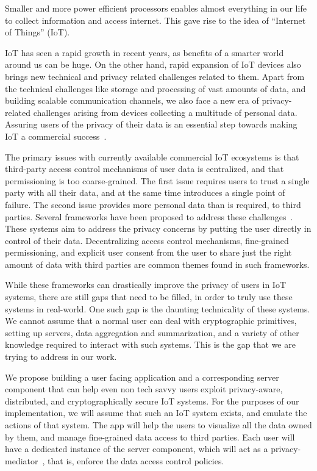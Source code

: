 Smaller and more power efficient processors enables almost everything in our life to collect information and access internet. This gave rise to the idea of “Internet of Things” (IoT).

IoT has seen a rapid growth in recent years, as benefits of a smarter world around us can be huge. On the other hand, rapid expansion of IoT devices also brings new technical and privacy related challenges related to them. Apart from the technical challenges like storage and processing of vast amounts of data, and building scalable communication channels, we also face a new era of privacy-related challenges arising from devices collecting a multitude of personal data. Assuring users of the privacy of their data is an essential step towards making IoT a commercial success~\cite{davies}.

The primary issues with currently available commercial IoT ecosystems is that third-party access control mechanisms of user data is centralized, and that permissioning is too coarse-grained. The first issue requires users to trust a single party with all their data, and at the same time introduces a single point of failure. The second issue provides more personal data than is required, to third parties. Several frameworks have been proposed to address these challenges~\cite{campbell,davies}. These systems aim to address the privacy concerns by putting the user directly in control of their data. Decentralizing access control mechanisms, fine-grained permissioning, and explicit user consent from the user to share just the right amount of data with third parties are common themes found in such frameworks.

While these frameworks can drastically improve the privacy of users in IoT systems, there are still gaps that need to be filled, in order to truly use these systems in real-world. One such gap is the daunting technicality of these systems. We cannot assume that a normal user can deal with cryptographic primitives, setting up servers, data aggregation and summarization, and a variety of other knowledge required to interact with such systems. This is the gap that we are trying to address in our work.

We propose building a user facing application and a corresponding server component that can help even non tech savvy users exploit privacy-aware, distributed, and cryptographically secure IoT systems. For the purposes of our implementation, we will assume that such an IoT system exists, and emulate the actions of that system. The app will help the users to visualize all the data owned by them, and manage fine-grained data access to third parties. Each user will have a dedicated instance of the server component, which will act as a privacy-mediator~\cite{davies}, that is, enforce the data access control policies.

